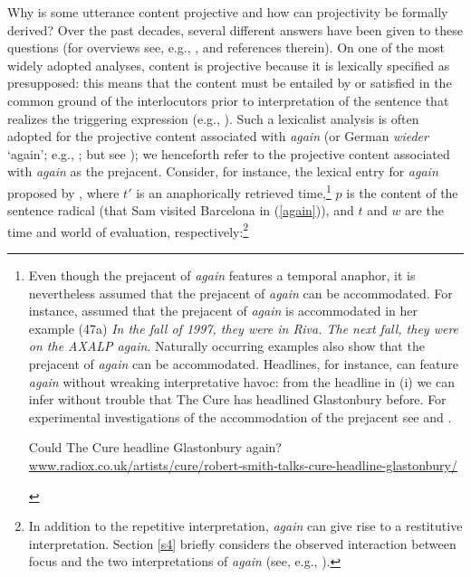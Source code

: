 \documentclass[a4paper,12pt]{article}
\newcommand{\6}{\mbox{$[\hspace*{-.6mm}[$}}
\newcommand{\9}{\mbox{$]\hspace*{-.6mm}]$}}
\begin{document}
Why is some utterance content projective and how can projectivity be formally derived? Over the past decades, several different answers have been given to these questions (for overviews see, e.g., \citealt{kadmon01,brst-salt10,beaver-geurts-sep}, and references therein). On one of the most widely adopted analyses, content is projective because it is lexically specified as presupposed: this means that the content must be entailed by or satisfied in the common ground of the interlocutors prior to interpretation of the sentence that realizes the triggering expression (e.g., \citealt{heim83,vds92}). Such a lexicalist analysis is often adopted for the projective content associated with {\em again} (or German {\em wieder} `again'; e.g., \citealt{kamp-rossdeutscher1994,fabricius-hansen2001,simons01,jaeger-blutner2003,vds-huitink2003,beck2006}; but see \citealt{abrusan2013b,abrusan2016}); we henceforth refer to the projective content associated with {\em again} as the prejacent. Consider, for instance, the lexical entry for {\em again} proposed by \citet{beck2006}, where $t'$ is an anaphorically retrieved time,\footnote{Even though the prejacent of {\em again} features a temporal anaphor, it is nevertheless assumed that the prejacent of {\em again} can be accommodated. For instance, \citet[fn.5]{beck2006} assumed that the prejacent of {\em again} is accommodated in her example (47a) {\em In the fall of 1997, they were in Riva. The next fall, they were on the AXALP again}. Naturally occurring examples also show that the prejacent of {\em again} can be accommodated. Headlines, for instance, can feature {\em again} without wreaking interpretative havoc: from the headline in (i) we can infer without trouble that The Cure has headlined Glastonbury before. For experimental investigations of the accommodation of the prejacent see \citealt{tiemann-thesis,tiemann-etal2015} and \citealt{bacovcin-etal2018}.

\begin{exe}
 Could The Cure headline Glastonbury again? 
\\ \url{www.radiox.co.uk/artists/cure/robert-smith-talks-cure-headline-glastonbury/}
\end{exe}
} 
$p$ is the content of the sentence radical (that Sam visited Barcelona in (\ref{again})), and $t$ and $w$ are the time and world of evaluation, respectively:\footnote{In addition to the repetitive interpretation, {\em again} can give rise to a restitutive interpretation. Section \ref{s4} briefly considers the observed interaction between focus and the two interpretations of {\em again} (see, e.g., \citealt{beck2006}).}
\end{document}
